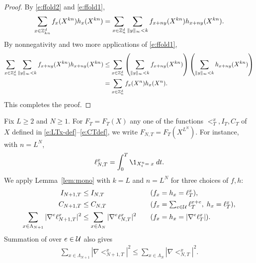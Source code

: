 \begin{proof}
By \eqref{e:ffold2} and \eqref{e:ffold1},
\begin{equation}
\sum_{x\in\Z_{kn}^d} f_x(X^{kn}) h_x(X^{kn})
  =
\sum_{x\in\Z_n^d}
\sum_{\|y\|_\infty < k}
  f_{x+ny}(X^{kn}) h_{x+ny}(X^{kn}).
\lbeq{mono}
\end{equation}
By nonnegativity and two more applications of \eqref{e:ffold1},
\begin{align}
\sum_{x\in{\mathbb Z}_n^d}
\sum_{\|y\|_\infty < k}
f_{x+ny}(X^{kn}) h_{x+ny}(X^{kn})
  &\le \sum_{x\in{\mathbb Z}_n^d}
      \left(\sum_{\|y\|_\infty < k} f_{x+ny}(X^{kn})\right)
      \left(\sum_{\|y\|_\infty < k} h_{x+ny}(X^{kn})\right) \nonumber \\
  &= \sum_{x\in{\mathbb Z}_n^d} f_x(X^n) h_x(X^n).
\end{align}
This completes the proof.
\end{proof}

Fix $L \geq 2$ and $N \geq 1$.
For $F_T = F_T(X)$ any one of the functions $\lt^x_T,I_T,C_T$
of $X$ defined in \eqref{e:LTx-def}--\eqref{e:CTdef},
we write $F_{N,T} = F_T(X^{L^N})$. For instance, with $n=L^N$,
\begin{equation}
\lt^x_{N,T} = \int_0^T \1_{X^{n}_t=\;x} \; dt.
\end{equation}
We apply Lemma~\ref{lem:mono} with $k = L$ and $n = L^N$
for three choices of $f,h$:
\begin{alignat}{2}
\label{e:ILT-mon}
I_{N+1,T} &\leq I_{N,T}\quad &&(f_x=h_x=\lt^x_T),
\\
\label{e:CSA-mon}
C_{N+1,T} &\leq C_{N,T} \quad &&(f_x=\textstyle{\sum_{e\in \Ucal}\lt^{x+e}_T},\; h_x=\lt^x_T) ,
\\
\sum_{x\in\Lambda_{N+1}} |\nabla^e \lt^x_{N+1,T}|^2
  &\leq
\sum_{x\in\Lambda_N} |\nabla^e \lt^x_{N,T}|^2
\quad &&
(f_x = h_x = \left|\nabla^e \lt^x_T\right|).
\lbeq{nabL}
\end{alignat}
Summation of  over $e\in\mathcal{U}$ also gives
\begin{align}
\label{e:gradLT-mon}
\sum_{x\in\Lambda_{N+1}} |\nabla \lt^x_{N+1,T}|^2
  \leq
\sum_{x\in\Lambda_N} |\nabla \lt^x_{N,T}|^2.
\end{align}

